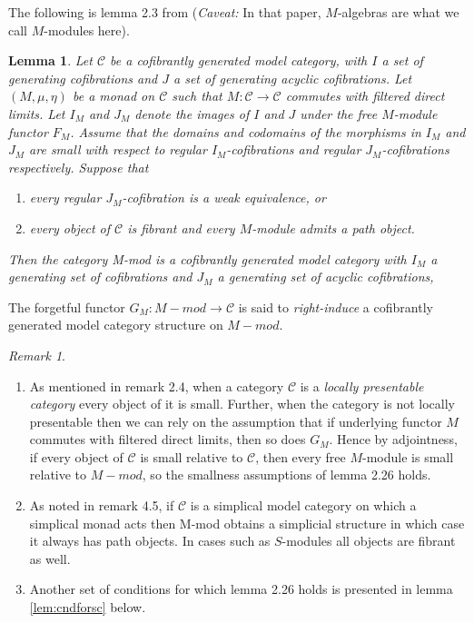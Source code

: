 \documentclass{article}
\newcommand{\cC}{\mathcal{C}}
\newtheorem{lemma}[theorem]{Lemma}
\theoremstyle{definition}
\theoremstyle{remark}
\newtheorem{remark}[theorem]{Remark}
\begin{document}
The following is lemma 2.3 from \cite{MR1734325} (\emph{Caveat:} In that paper, $M$-algebras are what we call $M$-modules here).
\begin{lemma} \label{lem:schwship}
    Let $\mathcal{C}$ be a cofibrantly generated model category, with $I$ a set of generating cofibrations and $J$ a set of generating acyclic cofibrations. Let $(M,\mu,\eta)$ be a monad on $\mathcal{C}$ such that $M:\mathcal{C} \rightarrow \mathcal{C}$ commutes with filtered direct limits. Let $I_{M}$ and $J_{M}$ denote the images of $I$ and $J$ under the free $M$-module functor $F_{M}$. Assume that the domains and codomains of the morphisms in $I_{M}$ and $J_{M}$ are small with respect to regular $I_{M}$-cofibrations and regular $J_{M}$-cofibrations respectively. Suppose that  
    \begin{enumerate}
        \item every regular $J_{M}$-cofibration is a weak equivalence, or
        \item every object of $\cC$ is fibrant and every $M$-module admits a path object.
    \end{enumerate}
    Then the category M-mod is a cofibrantly generated model category with $I_{M}$ a generating  set of cofibrations and $J_{M}$ a generating set of acyclic cofibrations,
\end{lemma}
 The forgetful functor $G_{M}:M-mod \rightarrow \cC$ is said to \textit{right-induce} a cofibrantly generated model category structure on $M-mod$.
 \begin{remark} \label{rem:postcofib}
     \begin{enumerate}
         \item As mentioned in \cite{MR1734325} remark 2.4, when a category $\cC$ is a \textit{locally presentable category} every object of it is small. Further, when the category is not locally presentable then we can rely on the assumption that if underlying functor $M$ commutes with filtered direct limits, then so does $G_{M}$. Hence by adjointness, if every object of $\cC$ is small relative to $\cC$, then every free $M$-module is small relative to $M-mod$, so the smallness assumptions of lemma 2.26 holds. 
         \item \label{rem:simppath} As noted in \cite{MR1734325} remark 4.5, if $\cC$ is a simplical model category on which a simplical monad acts then M-mod obtains a simplicial structure in which case it always has path objects. In cases such as \cite{MR1417719} $S$-modules all objects are fibrant as well.
         \item Another set of conditions for which lemma 2.26 holds is presented in lemma \ref{lem:cndforsc} below.
     \end{enumerate}
 \end{remark}
\end{document}

